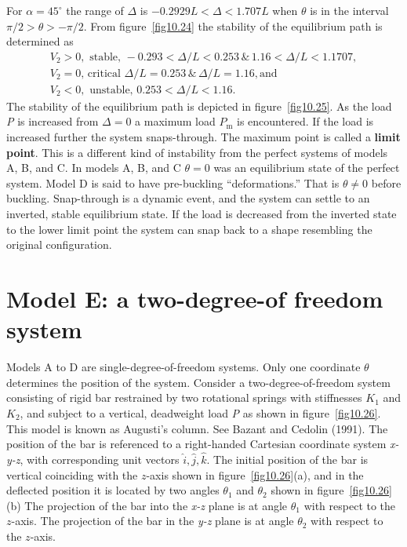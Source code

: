 \documentclass{AeroStructure-ERJohnson}
\begin{document}
\noindent For $\alpha=45^{\circ}$ the range of $\Delta$ is $-0.2929 L<\Delta<1.707 L$ when $\theta$ is in the interval $\pi / 2>\theta>-\pi / 2$. From figure~\ref{fig10.24} the stability of the equilibrium path is determined as
\begin{gather}\label{eq10.71}
V_{2}>0, \text { stable, }-0.293<\Delta / L<0.253\, \&\, 1.16<\Delta / L<1.1707,
\\\label{eq10.72}
V_{2}=0 \text {, critical } \Delta / L=0.253\, \&\, \Delta / L=1.16, \text{and}
\\
\label{eq10.73}
V_{2}<0, \text { unstable, } 0.253<\Delta / L<1.16.
\end{gather}
The stability of the equilibrium path is depicted in figure~\ref{fig10.25}. As the load \textit{P} is increased from $\Delta=0$ a maximum load $P_{\mathrm{m}}$ is encountered. If the load is increased further the system snaps-through. The maximum point is called\vadjust{\pagebreak} a \textbf{limit point}. This is a different kind of instability from the perfect systems of models A, B, and C. In models A, B, and C $\theta = 0$ was an equilibrium state of the perfect system. Model D is said to have pre-buckling ``deformations.'' That is $\theta \neq 0$ before buckling. Snap-through is a dynamic event, and the system can settle to an inverted, stable equilibrium state. If the load is decreased from the inverted state to the lower limit point the system can snap back to a shape resembling the original configuration.

\def\rightmark{Model E: a two-degree-of freedom system}

\section{Model E: a two-degree-of freedom system}\label{sec10.6}

Models A to D are single-degree-of-freedom systems. Only one coordinate $\theta$ determines the position of the system. Consider a two-degree-of-freedom system consisting of rigid bar restrained by two rotational springs with stiffnesses $\textit{K}_1$ and $\textit{K}_2$, and subject to a vertical, deadweight load \textit{P} as shown in figure~\ref{fig10.26}. This model is known as Augusti's column. See Bazant and Cedolin (1991). The position of the bar is referenced to a right-handed Cartesian coordinate system \textit{x-y-z}, with corresponding unit vectors $\hat{i}, \hat{j}, \hat{k}$. The initial position of the bar is vertical coinciding with the $z$-axis shown in figure~\ref{fig10.26}(a), and in the deflected position it is located by two angles $\theta_1$ and $\theta_2$ shown in figure~\ref{fig10.26}(b) The projection of the bar into the \textit{x-z} plane is at angle $\theta_1$ with respect to the $z$-axis. The projection of the bar in the \textit{y-z} plane is at angle $\theta_2$ with respect to the $z$-axis.
\end{document}
